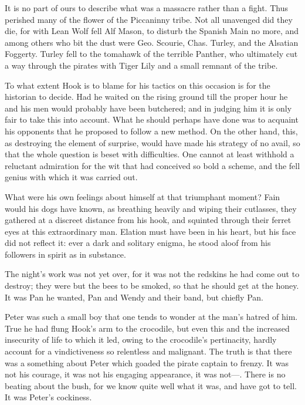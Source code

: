 It is no part of ours to describe what was a massacre rather than a
fight. Thus perished many of the flower of the Piccaninny tribe. Not
all unavenged did they die, for with Lean Wolf fell Alf Mason, to
disturb the Spanish Main no more, and among others who bit the dust
were Geo. Scourie, Chas. Turley, and the Alsatian Foggerty. Turley fell
to the tomahawk of the terrible Panther, who ultimately cut a way
through the pirates with Tiger Lily and a small remnant of the tribe.

To what extent Hook is to blame for his tactics on this occasion is for
the historian to decide. Had he waited on the rising ground till the
proper hour he and his men would probably have been butchered; and in
judging him it is only fair to take this into account. What he should
perhaps have done was to acquaint his opponents that he proposed to
follow a new method. On the other hand, this, as destroying the element
of surprise, would have made his strategy of no avail, so that the
whole question is beset with difficulties. One cannot at least withhold
a reluctant admiration for the wit that had conceived so bold a scheme,
and the fell genius with which it was carried out.

What were his own feelings about himself at that triumphant moment?
Fain would his dogs have known, as breathing heavily and wiping their
cutlasses, they gathered at a discreet distance from his hook, and
squinted through their ferret eyes at this extraordinary man. Elation
must have been in his heart, but his face did not reflect it: ever a
dark and solitary enigma, he stood aloof from his followers in spirit
as in substance.

The night's work was not yet over, for it was not the redskins he had
come out to destroy; they were but the bees to be smoked, so that he
should get at the honey. It was Pan he wanted, Pan and Wendy and their
band, but chiefly Pan.

Peter was such a small boy that one tends to wonder at the man's hatred
of him. True he had flung Hook's arm to the crocodile, but even this
and the increased insecurity of life to which it led, owing to the
crocodile's pertinacity, hardly account for a vindictiveness so
relentless and malignant. The truth is that there was a something about
Peter which goaded the pirate captain to frenzy. It was not his
courage, it was not his engaging appearance, it was not—. There is no
beating about the bush, for we know quite well what it was, and have
got to tell. It was Peter's cockiness.


